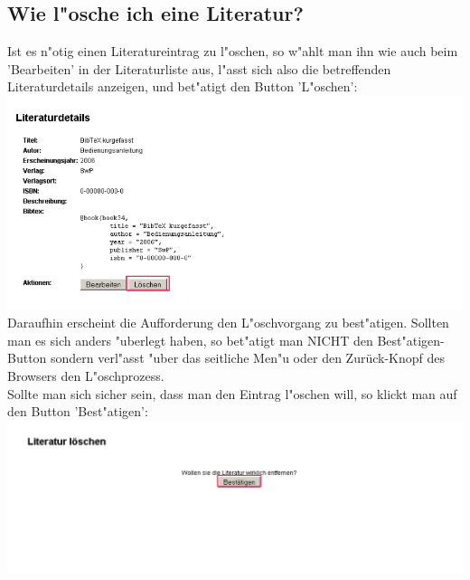 \subsection{Wie l"osche ich eine Literatur?}
Ist es n"otig einen Literatureintrag zu l"oschen, so w"ahlt man ihn wie auch beim 'Bearbeiten' in der Literaturliste aus, l"asst sich also die betreffenden Literaturdetails anzeigen, und bet"atigt den Button 'L"oschen':\\
\includegraphics[scale=0.8]{del_lit}\\
Daraufhin erscheint die Aufforderung den L"oschvorgang zu best"atigen. Sollten man es sich anders "uberlegt haben, so bet"atigt man NICHT den Best"atigen-Button sondern verl"asst "uber das seitliche Men"u oder den Zurück-Knopf des Browsers den L"oschprozess.\\
Sollte man sich sicher sein, dass man den Eintrag l"oschen will, so klickt man auf den Button 'Best"atigen':\\
\includegraphics[scale=0.8]{sure}


